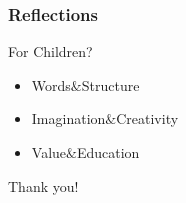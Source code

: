 \documentclass{beamer}
\begin{document}
\begin{frame}
    \frametitle{Reflections}
    \begin{block}{For Children?}
        \begin{itemize}
            \item Words$\&$Structure
            \item Imagination$\&$Creativity
            \item Value$\&$Education
        \end{itemize}
    \end{block}
\end{frame}

\begin{frame}
    \Huge{\centerline{Thank you!}}
\end{frame}
\end{document}
